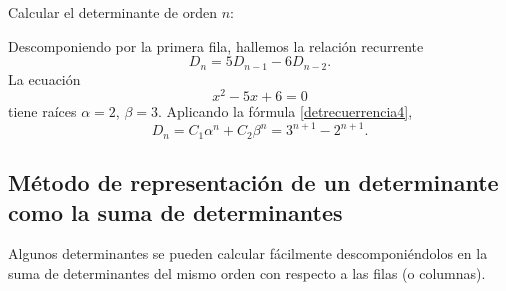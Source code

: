 \begin{examplebox}{}{}
    Calcular el determinante de orden $n$:
    \begin{matrizn}
    \end{matrizn}

    \tcblower
    \solucion Descomponiendo por la primera fila, hallemos la relación recurrente
    $$D_n = 5D_{n-1} - 6D_{n-2}.$$
    La ecuación
    $$x^2 - 5x + 6 = 0$$
    tiene raíces $\alpha = 2$, $\beta = 3$. Aplicando la fórmula \eqref{detrecuerrencia4},
    $$D_n = C_1 \alpha^n + C_2 \beta^n = 3^{n+1} - 2^{n+1}.$$
\end{examplebox}

\newpage

\subsection*{Método de representación de un determinante como la suma de determinantes}

Algunos determinantes se pueden calcular fácilmente descomponiéndolos en la suma de determinantes del mismo orden con respecto a las filas (o columnas).

